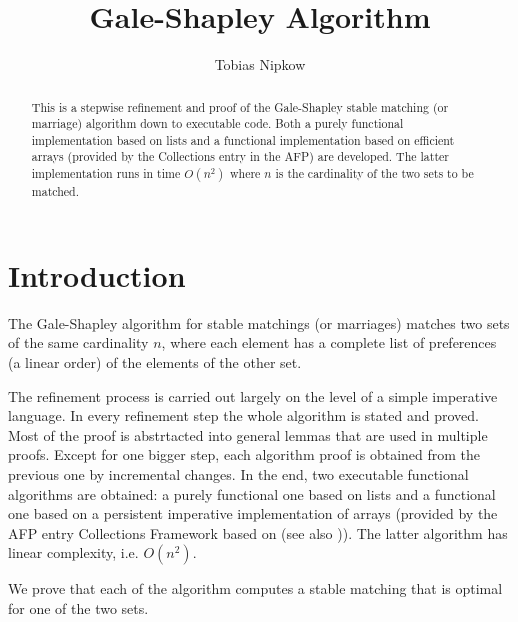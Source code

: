 \documentclass[11pt,a4paper]{article}
\begin{document}
\title{Gale-Shapley Algorithm}
\author{Tobias Nipkow}
\maketitle

\begin{abstract}
  This is a stepwise refinement and proof of the Gale-Shapley stable
  matching (or marriage) algorithm down to executable code. Both a
  purely functional implementation based on lists and a
  functional implementation based on efficient arrays (provided
  by the Collections entry in the AFP) are developed.  The latter
  implementation runs in time $O(n^2)$ where $n$ is the cardinality of
  the two sets to be matched.
\end{abstract}

\section{Introduction}

The Gale-Shapley algorithm \cite{GaleS62,GusfieldI89} for stable
matchings (or marriages) matches two sets of the same cardinality $n$,
where each element has a complete list of preferences (a linear order)
of the elements of the other set.

The refinement process is carried out largely on the level of a simple
imperative language. In every refinement step the whole algorithm is
stated and proved. Most of the proof is abstrtacted into general
lemmas that are used in multiple proofs. Except for one bigger step,
each algorithm proof is obtained from the previous one by incremental changes.
In the end, two executable functional algorithms are obtained:
a purely functional one based on lists and a functional one based on a
persistent imperative implementation of arrays (provided by the AFP entry
Collections Framework \cite{Collections-AFP} based on \cite{Baker91}
(see also \cite{ConchonF07})).
The latter algorithm has linear complexity, i.e. $O(n^2)$.

We prove that each of the algorithm computes a stable matching that is
optimal for one of the two sets.

\newpage





\end{document}
